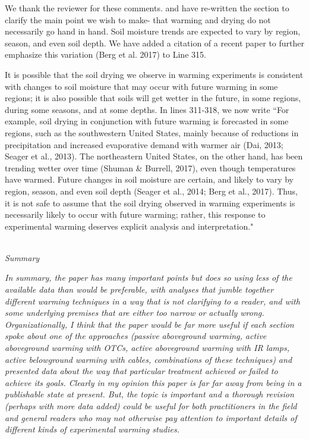 \documentclass[11pt,a4paper]{letter}
\begin{document}
\begin{letter}{}
\par We thank the reviewer for these comments. and have re-written the section to clarify the main point we wish to make- that warming and drying do not necessarily go hand in hand. Soil moisture trends are expected to vary by region, season, and even soil depth. We have added a citation of a recent paper to further emphasize this variation (Berg et al. 2017) to Line 315. 

\par It is possible that the soil drying we observe in warming experiments is consistent with changes to soil moisture that may occur with future warming in some regions; it is also possible that soils will get wetter in the future, in some regions, during some seasons, and at some depths. In lines 311-318, we now write ``For example, soil drying in conjunction with future warming is forecasted in some regions, such as the southwestern United States, mainly because of reductions in precipitation and increased evaporative demand with warmer air (Dai, 2013; Seager et al., 2013). The northeastern United States, on the other hand, has been trending wetter over time (Shuman & Burrell, 2017), even though temperatures have warmed. Future changes in soil moisture are certain, and likely to vary by region, season, and even soil depth (Seager et al., 2014; Berg et al., 2017). Thus, it is not safe to assume that the soil drying observed in warming experiments is necessarily likely to occur with future warming; rather, this response to experimental warming deserves explicit analysis and interpretation."

\\
\emph{Summary}

\emph{In summary, the paper has many important points but does so using less of the available data
than would be preferable, with analyses that jumble together different warming techniques in a
way that is not clarifying to a reader, and with some underlying premises that are either too
narrow or actually wrong. Organizationally, I think that the paper would be far more useful if
each section spoke about one of the approaches (passive aboveground warming, active
aboveground warming with OTCs, active aboveground warming with IR lamps, active
belowground warming with cables, combinations of these techniques) and presented data
about the way that particular treatment achieved or failed to achieve its goals. Clearly in my
opinion this paper is far far away from being in a publishable state at present. But, the topic is
important and a thorough revision (perhaps with more data added) could be useful for both
practitioners in the field and general readers who may not otherwise pay attention to
important details of different kinds of experimental warming studies.}


\end{letter}
\end{document}
